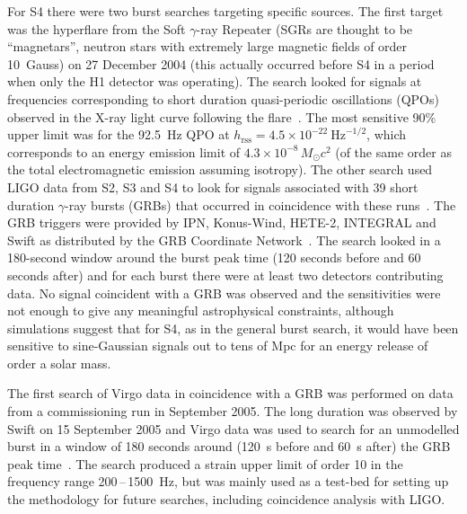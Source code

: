 For S4 there were two burst searches targeting specific sources. The first
target was the hyperflare from the Soft $\gamma$-ray Repeater 
(SGRs are thought to be ``magnetars'', neutron stars with extremely large
magnetic fields of order 10~Gauss) on 27 December 2004
\cite{Hurley:2005} (this actually occurred before S4 in a period when only the
H1 detector was operating). The search looked for signals at frequencies
corresponding to short duration quasi-periodic oscillations (QPOs) observed in
the X-ray light curve following the flare~\cite{Abbott:2007c}. The most
sensitive 90\% upper limit was for the 92.5~Hz QPO at $h_{\mathrm{rss}} =
4.5\times10^{-22} \mathrm{\ Hz}^{-1/2}$, which corresponds to an energy emission limit
of $4.3\times10^{-8}\,M_{\odot}c^2$ (of the same order as the total
electromagnetic emission assuming isotropy). The other search used LIGO data
from S2, S3 and S4 to look for signals associated with 39 short duration
$\gamma$-ray bursts (GRBs) that occurred in coincidence with these
runs~\cite{Abbott:2008c}. The GRB triggers were provided by IPN,
Konus-Wind, HETE-2, INTEGRAL and Swift as distributed by the GRB
Coordinate Network~\cite{GCN}. The search looked in a 180-second
window around the burst peak time (120 seconds before and 60 seconds
after) and for each burst there were at least two detectors
contributing data. No signal coincident with a GRB was observed and
the sensitivities were not enough to give any meaningful astrophysical
constraints, although simulations suggest that for S4, as in the general burst
search, it would have been sensitive to sine-Gaussian signals out to tens of Mpc
for an energy release of order a solar mass.


The first search of Virgo data in coincidence with a GRB was performed on data
from a commissioning run in September 2005. The long duration  was
observed by Swift on 15 September 2005 and Virgo data was used to search for an
unmodelled burst in a window of 180 seconds around (120~s before and 60~s after)
the GRB peak time~\cite{Acernese:2008a}. The search produced a strain upper
limit of order 10 in the frequency range 200\,--\,1500~Hz, but was mainly
used as a test-bed for setting up the methodology for future searches, including
coincidence analysis with LIGO.


